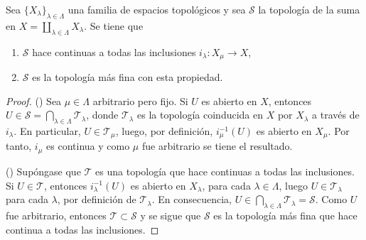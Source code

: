 

\begin{proposition}
Sea $\{ X_{\lambda} \}_{\lambda \in \Lambda}$ una familia de espacios topológicos y sea $\mathcal{S}$ la topología de la suma en $X = \coprod_{\lambda \in \Lambda} X_{\lambda}$. Se tiene que
\begin{enumerate}[label=\textnormal{(\roman*)}]
\item $\mathcal{S}$ hace continuas a todas las inclusiones $i_{\lambda} : X_{\mu} \longrightarrow X$,
\item $\mathcal{S}$ es la topología más fina con esta propiedad.
\end{enumerate} 
\end{proposition}

\begin{proof}
({\scshape{}}) Sea $\mu \in \Lambda$ arbitrario pero fijo. Si $U$ es abierto en $X$, entonces $U \in \mathcal{S} = \bigcap_{\lambda \in \Lambda} \mathcal{T}_{\lambda}$, donde $\mathcal{T}_{\lambda}$ es la topología coinducida en $X$ por $X_{\lambda}$ a través de $i_{\lambda}$. En particular, $U \in \mathcal{T}_{\mu}$, luego, por definición, $i^{-1}_{\mu}(U)$ es abierto en $X_{\mu}$. Por tanto, $i_{\mu}$ es continua y como $\mu$ fue arbitrario se tiene el resultado.
\bigskip

({\scshape{}}) Supóngase que $\mathcal{T}$ es una topología que hace continuas a todas las inclusiones. Si $U \in \mathcal{T}$, entonces $i^{-1}_{\lambda}(U)$ es abierto en $X_{\lambda}$, para cada $\lambda \in \Lambda$, luego $U \in \mathcal{T}_{\lambda}$ para cada $\lambda$, por definición de $\mathcal{T}_{\lambda}$. En consecuencia, $U \in \bigcap_{\lambda \in \Lambda} \mathcal{T}_{\lambda} = \mathcal{S}$. Como $U$ fue arbitrario, entonces $\mathcal{T} \subset \mathcal{S}$ y se sigue que $\mathcal{S}$ es la topología más fina que hace continua a todas las inclusiones.
\end{proof}
